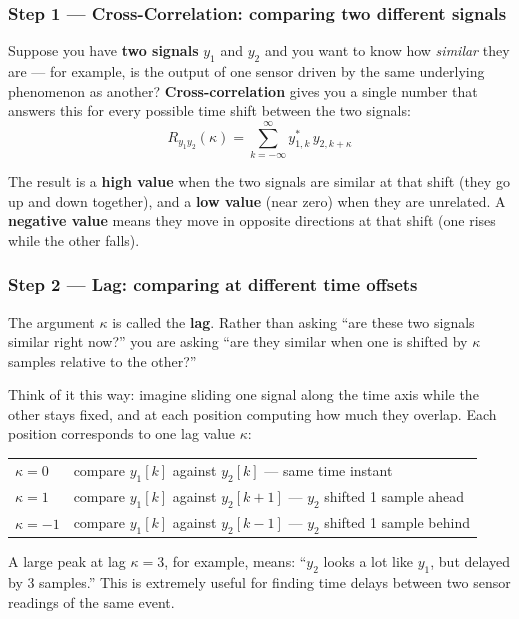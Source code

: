 \documentclass[12pt, a4paper]{article}
\begin{document}
\subsubsection*{Step 1 --- Cross-Correlation: comparing two different signals}

Suppose you have \textbf{two signals} $y_1$ and $y_2$ and you want to
know how \emph{similar} they are --- for example, is the output of one
sensor driven by the same underlying phenomenon as another?
\textbf{Cross-correlation} gives you a single number that answers this
for every possible time shift between the two signals:
\[
  R_{y_1 y_2}(\kappa) = \sum_{k=-\infty}^{\infty} y_{1,k}^*\, y_{2,k+\kappa}
\]

The result is a \textbf{high value} when the two signals are similar at
that shift (they go up and down together), and a \textbf{low value} (near
zero) when they are unrelated. A \textbf{negative value} means they move
in opposite directions at that shift (one rises while the other falls).

\subsubsection*{Step 2 --- Lag: comparing at different time offsets}

The argument $\kappa$ is called the \textbf{lag}. Rather than asking
``are these two signals similar right now?'' you are asking
``are they similar when one is shifted by $\kappa$ samples relative to
the other?''

Think of it this way: imagine sliding one signal along the time axis
while the other stays fixed, and at each position computing how much
they overlap. Each position corresponds to one lag value $\kappa$:

\begin{center}
\small\ttfamily
\begin{tabular}{ll}
$\kappa = 0$  & compare $y_1[k]$ against $y_2[k]$ --- same time instant \\
$\kappa = 1$  & compare $y_1[k]$ against $y_2[k+1]$ --- $y_2$ shifted 1 sample ahead \\
$\kappa = -1$ & compare $y_1[k]$ against $y_2[k-1]$ --- $y_2$ shifted 1 sample behind \\
\end{tabular}
\end{center}

A large peak at lag $\kappa = 3$, for example, means: ``$y_2$ looks a
lot like $y_1$, but delayed by 3 samples.'' This is extremely useful
for finding time delays between two sensor readings of the same event.
\end{document}
